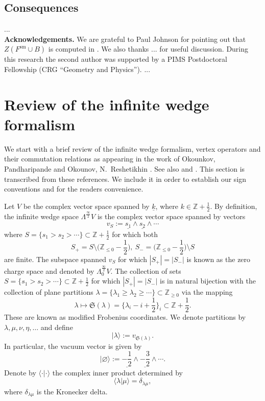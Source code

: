 \documentclass{amsart}
\theoremstyle{definition}
\newcommand{\ZZ} {\mathbb{Z}}		%
\newcommand{\sm}{\mathrm{sm}}
\begin{document}
\subsection{Consequences} ... \\

\noindent \textbf{Acknowledgements.} We are grateful to Paul Johnson for pointing out that $Z(F^{\sm} \cup B)$ is computed in \cite{BO}. We also thanks ... for useful discussion. During this research the second author was supported by a PIMS Postdoctoral Fellowship (CRG ``Geometry and Physics''). ...


\section{Review of the infinite wedge formalism}

We start with a brief review of the infinite wedge formalism, vertex operators and their commutation relations as appearing in the work of Okounkov, Pandharipande \cite{OP} and Okounov, N.~Reshetikhin \cite{OR2}. See also \cite{Kac} and \cite{You}. This section is transcribed from these references. We include it in order to establish our sign conventions and for the readers convenience.

Let $V$ be the complex vector space spanned by $\underline{k}$, where $k \in \ZZ + \frac{1}{2}$. By definition, the infinite wedge space $\Lambda^{\frac{\infty}{2}} V$ is the complex vector space spanned by vectors
$$
v_S := \underline{s_1} \wedge \underline{s_2} \wedge \cdots
$$
where $S = \{s_1 > s_2 > \cdots\} \subset \ZZ + \frac{1}{2}$ for which both 
$$
S_+ = S \setminus \Big(\ZZ_{\leq 0} - \frac{1}{2} \Big), \ S_- = \Big(\ZZ_{\leq 0} - \frac{1}{2} \Big) \setminus S
$$ 
are finite. The subspace spanned $v_S$ for which $|S_+| = |S_-|$ is known as the zero charge space and denoted by $\Lambda^{\frac{\infty}{2}}_{0} V$. The collection of sets $S = \{s_1 > s_2 > \cdots\} \subset \ZZ + \frac{1}{2}$ for which $|S_+| = |S_-|$ is in natural bijection with the collection of plane partitions $\lambda = \{\lambda_1 \geq \lambda_2 \geq \cdots\} \subset \ZZ_{\geq 0}$ via the mapping \cite[2.1.3]{OR}
$$
\lambda \mapsto \mathfrak{S}(\lambda) = \Big\{ \lambda_i - i + \frac{1}{2} \Big\}_i \subset \ZZ + \frac{1}{2}.
$$
These are known as modified Frobenius coordinates. We denote partitions by $\lambda, \mu, \nu, \eta,  \ldots$ and define 
$$|\lambda\rangle := v_{\mathfrak{S}(\lambda)}.$$
In particular, the vacuum vector is given by
$$
|\varnothing \rangle := \underline{-\frac{1}{2}} \wedge \underline{-\frac{3}{2}} \wedge \cdots.
$$
Denote by $\langle \cdot | \cdot \rangle$ the complex inner product determined by
$$
\langle \lambda | \mu \rangle = \delta_{\lambda\mu},
$$
where $\delta_{\lambda\mu}$ is the Kronecker delta. 
\end{document}
